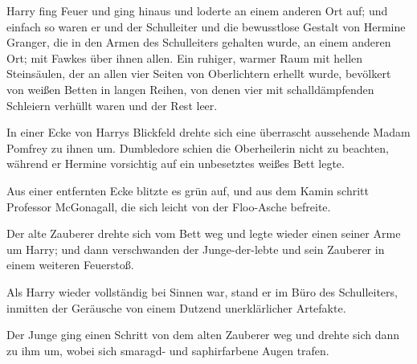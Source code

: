 Harry fing Feuer und ging hinaus und loderte an einem anderen Ort auf; und einfach so waren er und der Schulleiter und die bewusstlose Gestalt von Hermine Granger, die in den Armen des Schulleiters gehalten wurde, an einem anderen Ort; mit Fawkes über ihnen allen. Ein ruhiger, warmer Raum mit hellen Steinsäulen, der an allen vier Seiten von Oberlichtern erhellt wurde, bevölkert von weißen Betten in langen Reihen, von denen vier mit schalldämpfenden Schleiern verhüllt waren und der Rest leer.

In einer Ecke von Harrys Blickfeld drehte sich eine überrascht aussehende Madam Pomfrey zu ihnen um. Dumbledore schien die Oberheilerin nicht zu beachten, während er Hermine vorsichtig auf ein unbesetztes weißes Bett legte.

Aus einer entfernten Ecke blitzte es grün auf, und aus dem Kamin schritt Professor McGonagall, die sich leicht von der Floo-Asche befreite.

Der alte Zauberer drehte sich vom Bett weg und legte wieder einen seiner Arme um Harry; und dann verschwanden der Junge-der-lebte und sein Zauberer in einem weiteren Feuerstoß.

\later

Als Harry wieder vollständig bei Sinnen war, stand er im Büro des Schulleiters, inmitten der Geräusche von einem Dutzend unerklärlicher Artefakte.

Der Junge ging einen Schritt von dem alten Zauberer weg und drehte sich dann zu ihm um, wobei sich smaragd- und saphirfarbene Augen trafen.

